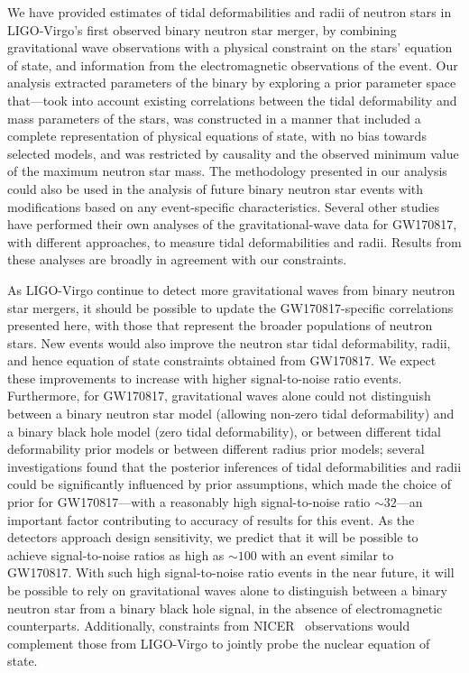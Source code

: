 We have provided estimates of tidal deformabilities and radii of neutron stars in LIGO-Virgo's first observed binary neutron star merger, by combining gravitational wave observations with a physical constraint on the stars' equation of state, and information from the electromagnetic observations of the event. Our analysis extracted parameters of the binary by exploring a prior parameter space that---took into account existing correlations between the tidal deformability and mass parameters of the stars, was constructed in a manner that included a complete representation of physical equations of state, with no bias towards selected models, and was restricted by causality and the observed minimum value of the maximum neutron star mass. The methodology presented in our analysis could also be used in the analysis of future binary neutron star events with modifications based on any event-specific characteristics. Several other studies~\cite{Abbott:2018exr,Radice:2018ozg,Coughlin:2018fis,capano_stringent_2020} have performed their own analyses of the gravitational-wave data for GW170817, with different approaches, to measure tidal deformabilities and radii. Results from these analyses are broadly in agreement with our constraints.

As LIGO-Virgo continue to detect more gravitational waves from binary neutron star mergers, it should be possible to update the GW170817-specific correlations presented here, with those that represent the broader populations of neutron stars. New events would also improve the neutron star tidal deformability, radii, and hence equation of state constraints obtained from GW170817. We expect these improvements to increase with higher signal-to-noise ratio events. Furthermore, for GW170817, gravitational waves alone could not distinguish between a binary neutron star model (allowing non-zero tidal deformability) and a binary black hole model (zero tidal deformability), or between different tidal deformability prior models or between different radius prior models; several investigations found that the posterior inferences of tidal deformabilities and radii could be significantly influenced by prior assumptions, which made the choice of prior for GW170817---with a reasonably high signal-to-noise ratio $\sim 32$---an important factor contributing to accuracy of results for this event. As the detectors approach design sensitivity, we predict that it will be possible to achieve signal-to-noise ratios as high as $\sim 100$ with an event similar to GW170817. With such high signal-to-noise ratio events in the near future, it will be possible to rely on gravitational waves alone to distinguish between a binary neutron star from a binary black hole signal, in the absence of electromagnetic counterparts. Additionally, constraints from NICER~\cite{2012SPIE.8443E..13G} observations would complement those from LIGO-Virgo to jointly probe the nuclear equation of state.

